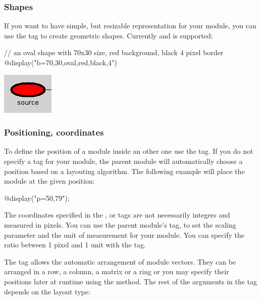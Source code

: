 \subsubsection{Shapes}

If you want to have simple, but resizable representation for your module, you can use
the  tag to create geometric shapes. Currently  and 
is supported:

\begin{ned}
// an oval shape with 70x30 size, red background, black 4 pixel border
@display("b=70,30,oval,red,black,4")
\end{ned}

\begin{center}
\includegraphics{figures/graphics-btag}
\end{center}

\subsubsection{Positioning, coordinates}

To define the position of a module inside an other one use the  tag.
If you do not specify a  tag for your module, the parent module will
automatically choose a position based on a layouting algorithm.
The following example will place the module at the given position:
\begin{ned}
@display("p=50,79");
\end{ned}

\begin{note}
The coordinates specified in the ,  or  tags are not necessarily
integers and measured in pixels. You can use the parent module's  tag,
to set the scaling parameter and the unit of measurement for your module.
You can specify the ratio between 1 pixel and 1 unit with the  tag.
\end{note}

The  tag allows the automatic arrangement of module vectors. They can be
arranged in a row, a column, a matrix or a ring or you may specify their positions
later at runtime using the  method. The rest of the arguments
in the  tag depends on the layout type:

